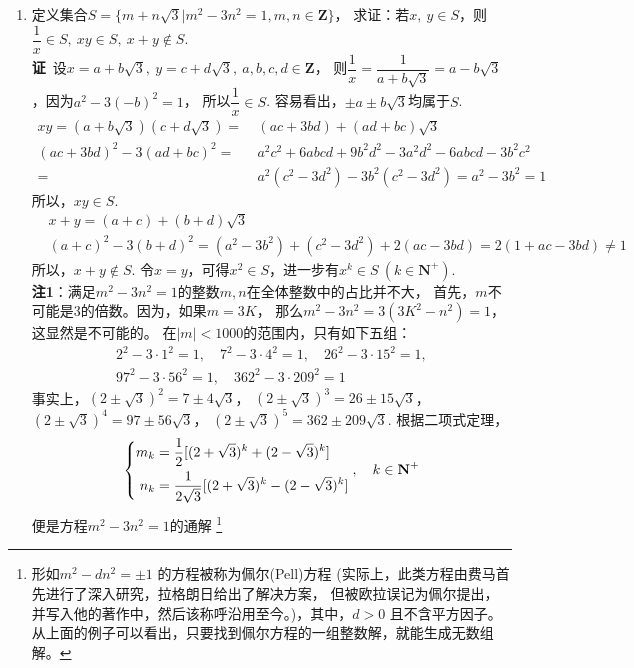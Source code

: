 \begin{enumerate}[label={【\textbf{例\thechapter.\arabic*}】},
 leftmargin=\inteval{\myenumleftmargin}pt,
 itemsep=\inteval{\myenumitempsep}pt,
 itemindent=\inteval{\myenumitemindent}pt]
\item 定义集合$ S=\{m+n\sqrt{3}|m^2-3n^2=1,m,n\in \textbf{Z}\} $，
求证：若$ x,\ y\in S $，则$ \dfrac{1}{x}\in S,\ xy \in　S,\ x+y\notin S $. \\
\textbf{证}\ 设$ x=a+b\sqrt{3},\ y=c+d\sqrt{3},\ a,b,c,d\in \textbf{Z} $，
则$ \dfrac{1}{x}=\dfrac{1}{a+b\sqrt{3}}=a-b\sqrt{3} $，因为$ a^2-3(-b)^2=1 $，
所以$ \dfrac{1}{x}\in S $. 容易看出，$ \pm a \pm b\sqrt{3} $均属于$ S $. 
\begin{align*}
    xy=(a+b\sqrt{3})(c+d\sqrt{3})=&\  (ac+3bd)+(ad+bc)\sqrt{3} \\
    (ac+3bd)^2-3(ad+bc)^2 =&\  a^2c^2+6abcd+9b^2d^2-3a^2d^2-6abcd-3b^2c^2 \\
    =&\  a^2(c^2-3d^2)-3b^2(c^2-3d^2)=a^2-3b^2=1 
\end{align*}
所以，$ xy\in S $.
\begin{align*}
    & x+y=(a+c)+(b+d)\sqrt{3} \\
    & (a+c)^2-3(b+d)^2=(a^2-3b^2)+(c^2-3d^2)+2(ac-3bd)=2(1+ac-3bd)\neq 1
\end{align*}
所以，$ x+y\notin S $. 令$ x=y $，可得$ x^2\in S $，进一步有$ x^k\in S\ 
(k\in \textbf{N}^+) $. \\
\textbf{注1}：满足$ m^2-3n^2=1 $的整数$ m,n $在全体整数中的占比并不大，
首先，$ m $不可能是3的倍数。因为，如果$ m=3K $，
那么$ m^2-3n^2=3(3K^2-n^2)=1 $，这显然是不可能的。
在$ |m|<1000 $的范围内，只有如下五组：
\begin{gather*}
    2^2-3\cdot 1^2=1,\quad  7^2-3\cdot 4^2=1,\quad  26^2-3\cdot 15^2=1, \\
    97^2-3\cdot 56^2=1,\quad 362^2-3\cdot 209^2=1
\end{gather*}
事实上，$ (2\pm\sqrt{3})^2=7\pm 4\sqrt{3} $，
$ (2\pm\sqrt{3})^3=26\pm 15\sqrt{3} $，
$ (2\pm\sqrt{3})^4=97\pm 56\sqrt{3} $，
$ (2\pm \sqrt{3})^5=362\pm 209\sqrt{3} $. 
根据二项式定理，
\begin{gather*}
    \left\{ \begin{aligned}
        m_k &=\dfrac{1}{2}[(2+\sqrt{3})^k+(2-\sqrt{3})^k] \\ 
        n_k &=\dfrac{1}{2\sqrt{3}}[(2+\sqrt{3})^k-(2-\sqrt{3})^k]    
    \end{aligned} \right. , \quad  k\in \textbf{N}^+
\end{gather*}
便是方程$ m^2-3n^2=1 $的通解
\footnote{形如$ m^2-dn^2=\pm 1 $ 的方程被称为佩尔(Pell)方程
(实际上，此类方程由费马首先进行了深入研究，拉格朗日给出了解决方案，
但被欧拉误记为佩尔提出，并写入他的著作中，然后该称呼沿用至今。)，其中，$ d>0 $
且不含平方因子。从上面的例子可以看出，只要找到佩尔方程的一组整数解，就能生成无数组解。
}
\end{enumerate}
